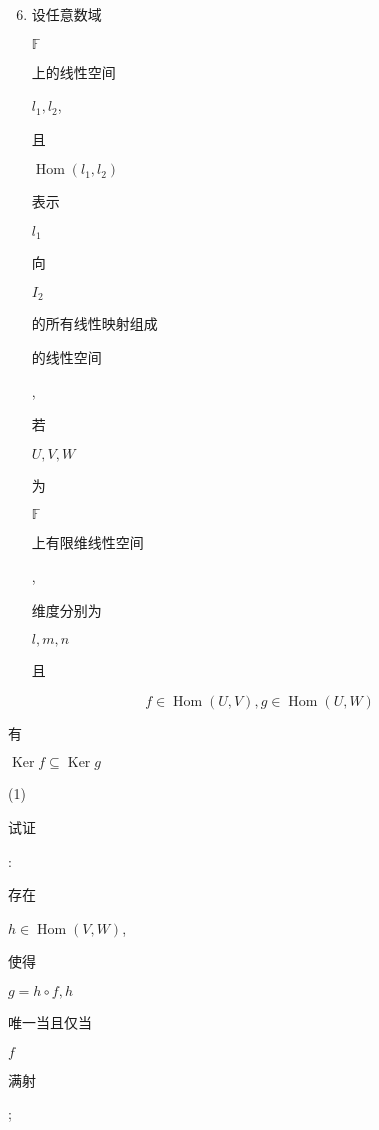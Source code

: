 \documentclass[10pt]{article}
\begin{document}
\begin{enumerate}
  \setcounter{enumi}{5}
  \item \begin{CJK}{UTF8}{mj}设任意数域\end{CJK} $\mathbb{F}$ \begin{CJK}{UTF8}{mj}上的线性空间\end{CJK} $l_{1}, l_{2}$, \begin{CJK}{UTF8}{mj}且\end{CJK} $\operatorname{Hom}\left(l_{1}, l_{2}\right)$ \begin{CJK}{UTF8}{mj}表示\end{CJK} $l_{1}$ \begin{CJK}{UTF8}{mj}向\end{CJK} $I_{2}$ \begin{CJK}{UTF8}{mj}的所有线性映射组成\end{CJK} \begin{CJK}{UTF8}{mj}的线性空间\end{CJK}, \begin{CJK}{UTF8}{mj}若\end{CJK} $U, V, W$ \begin{CJK}{UTF8}{mj}为\end{CJK} $\mathbb{F}$ \begin{CJK}{UTF8}{mj}上有限维线性空间\end{CJK}, \begin{CJK}{UTF8}{mj}维度分别为\end{CJK} $l, m, n$ \begin{CJK}{UTF8}{mj}且\end{CJK}
\end{enumerate}
$$
f \in \operatorname{Hom}(U, V), g \in \operatorname{Hom}(U, W)
$$
\begin{CJK}{UTF8}{mj}有\end{CJK} $\operatorname{Ker} f \subseteq \operatorname{Ker} g$

(1) \begin{CJK}{UTF8}{mj}试证\end{CJK}: \begin{CJK}{UTF8}{mj}存在\end{CJK} $h \in \operatorname{Hom}(V, W)$, \begin{CJK}{UTF8}{mj}使得\end{CJK} $g=h \circ f, h$ \begin{CJK}{UTF8}{mj}唯一当且仅当\end{CJK} $f$ \begin{CJK}{UTF8}{mj}满射\end{CJK};
\end{document}
